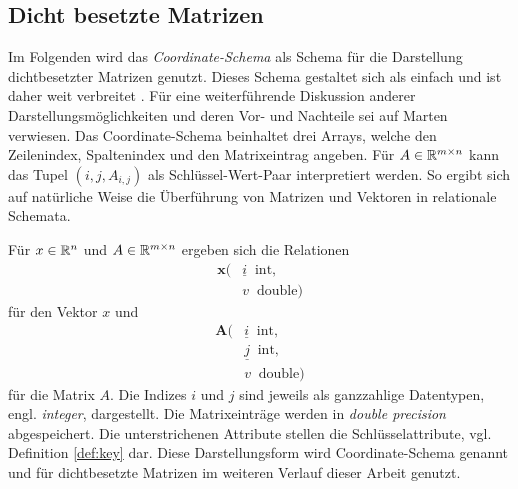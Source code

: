 \subsection*{Dicht besetzte Matrizen}
Im Folgenden wird das \textit{Coordinate-Schema} \cite{martendiss} als Schema für die Darstellung dichtbesetzter Matrizen genutzt. Dieses Schema gestaltet sich als einfach und ist daher weit verbreitet \cite{saad1990sparskit}.
Für eine weiterführende Diskussion anderer Darstellungsmöglichkeiten und deren Vor- und Nachteile sei auf Marten \cite{martendiss} verwiesen. 
Das Coordinate-Schema beinhaltet drei Arrays, welche den Zeilenindex, Spaltenindex und den Matrixeintrag angeben. Für $A \in \mathbb{R}^{m \times n}$ kann das Tupel $(i,j,A_{i,j})$ als Schlüssel-Wert-Paar interpretiert werden. So ergibt sich auf natürliche Weise die Überführung von Matrizen und Vektoren in relationale Schemata.
\begin{defi}
    \label{def:coordinate_sheme}
    Für $x \in \mathbb{R}^n$ und $A \in \mathbb{R}^{m \times n}$ ergeben sich die Relationen
    \begin{align*}
        \mathbf{x}( &\underline{i} \; \; \mathrm{int}, \\
        &v \; \; \mathrm{double})
    \end{align*}
    für den Vektor $x$ und
    \begin{align*}
        \mathbf{A}( &\underline{i} \; \; \mathrm{int}, \\
        &\underline{j} \; \;\mathrm{int},\\
        &v \; \; \mathrm{double})
    \end{align*} für die Matrix $A$. Die Indizes $i$ und $j$ sind jeweils als ganzzahlige Datentypen, engl. \textit{integer}, dargestellt. Die Matrixeinträge werden in \textit{double precision} \cite{30711} abgespeichert. Die unterstrichenen Attribute stellen die Schlüsselattribute, vgl. Definition \ref{def:key} dar. Diese Darstellungsform wird Coordinate-Schema genannt und für dichtbesetzte Matrizen im weiteren Verlauf dieser Arbeit genutzt.
\end{defi}

